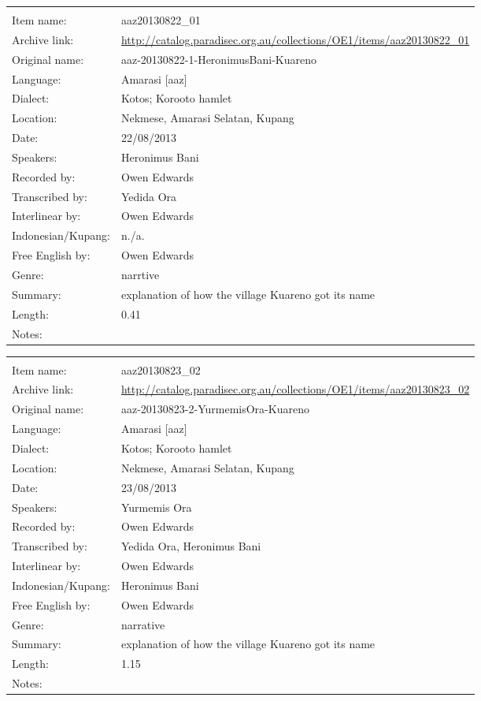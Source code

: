 \newpage
\noindent
\wg\begin{tabular}{lL{.67\textwidth}}
			& \\
Item name:			& aaz20130822{\_}01\\
Archive link:			& \url{http://catalog.paradisec.org.au/collections/OE1/items/aaz20130822_01}\\
Original name:			& aaz-20130822-1-HeronimusBani-Kuareno\\
Language:				& Amarasi [aaz] \\
Dialect:				& Kotos; Koro{\Q}oto hamlet \\
Location:				& Nekmese{\Q}, Amarasi Selatan, Kupang \\
Date:				& 22/08/2013\\
Speakers:				& Heronimus Bani\\
Recorded by:			& Owen Edwards\\
Transcribed by:		& Yedida Ora\\
Interlinear by:		& Owen Edwards \\
Indonesian/Kupang:		& n./a.\\
Free English by:		& Owen Edwards\\
Genre:				& narrtive\\
Summary:				& explanation of how the village Kuareno{\Q} got its name\\
Length:				& 0.41\\
Notes:				& \\
\end{tabular}

\newpage
\noindent
\wg\begin{tabular}{lL{.67\textwidth}}
			& \\
Item name:			& aaz20130823{\_}02\\
Archive link:			& \url{http://catalog.paradisec.org.au/collections/OE1/items/aaz20130823_02}\\
Original name:			& aaz-20130823-2-YurmemisOra-Kuareno\\
Language:				& Amarasi [aaz] \\
Dialect:				& Kotos; Koro{\Q}oto hamlet \\
Location:				& Nekmese{\Q}, Amarasi Selatan, Kupang \\
Date:				& 23/08/2013\\
Speakers:				& Yurmemis Ora\\
Recorded by:			& Owen Edwards\\
Transcribed by:		& Yedida Ora, Heronimus Bani\\
Interlinear by:		& Owen Edwards \\
Indonesian/Kupang:		& Heronimus Bani\\
Free English by:		& Owen Edwards\\
Genre:				& narrative \\
Summary:				& explanation of how the village Kuareno{\Q} got its name\\
Length:				& 1.15\\
Notes:				& \\
\end{tabular}

